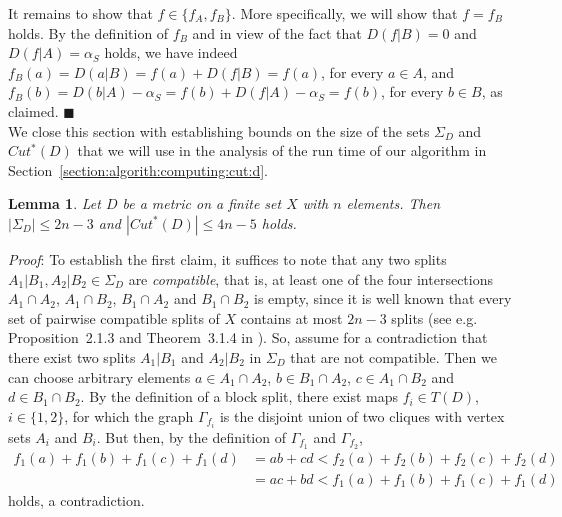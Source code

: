 \documentclass[12pt]{article}
\newtheorem{lemma}[prop]{Lemma}
\begin{document}
It remains to show that \(f \in \{f_A,f_B\}\). More specifically, we will show
that \(f=f_B\) holds. By the definition
of \(f_B\) and in view of the fact that \(D(f|B)=0\) and
\(D(f|A) = \alpha_S\) holds, we have indeed
\(f_B(a) = D(a|B) = f(a) + D(f|B) = f(a)\),
for every $a\in A$, and
\(f_B(b) = D(b|A) - \alpha_S = f(b) + D(f|A) - \alpha_S = f(b)\),
for every $b\in B$, as claimed.
\hfill\(\blacksquare\)\\

We close this section with establishing bounds on the size of the sets 
\(\Sigma_D\) and \(Cut^*(D)\) that we will use in the analysis
of the run time of our algorithm in Section~\ref{section:algorith:computing:cut:d}. 

\begin{lemma}
\label{lemma:number:cut:points}
Let \(D\) be a metric on a finite set \(X\) with \(n\) elements.
Then  \(|\Sigma_D| \le 2n-3\) and \(|Cut^*(D)| \le 4n - 5\) holds.
\end{lemma}


\noindent\textsl{Proof}:
To establish the first claim, it suffices to
note that any two splits \(A_1|B_1, A_2|B_2 \in \Sigma_D\) 
are \emph{compatible}, that is, at least one 
of the four intersections \(A_1 \cap A_2\), \(A_1 \cap B_2\), 
\(B_1 \cap A_2\) and \(B_1 \cap B_2\) is empty, since it
is well known that every set of pairwise compatible splits of
\(X\) contains at most \(2n-3\) splits (see e.g. Proposition~2.1.3 and 
Theorem~3.1.4 in \cite{sem-ste-03a}). 
So, assume for a contradiction that there exist two splits \(A_1|B_1\)
and \(A_2|B_2\) in \(\Sigma_D\) that are not compatible. Then we can
choose arbitrary elements \(a \in A_1 \cap A_2\), \(b \in B_1 \cap A_2\),
\(c \in A_1 \cap B_2\) and \(d \in B_1 \cap B_2\). By the definition
of a block split, there exist maps \(f_i \in T(D)\), \(i \in \{1,2\}\), 
for which the graph \(\Gamma_{f_i}\) is the 
disjoint union of two cliques with vertex sets \(A_i\) and \(B_i\).
But then, by the definition of \(\Gamma_{f_1}\) and \(\Gamma_{f_2}\),
\begin{align*}
f_1(a)+f_1(b)+f_1(c)+f_1(d) &= ab + cd < f_2(a)+f_2(b)+f_2(c)+f_2(d)\\
&= ac+bd < f_1(a)+f_1(b)+f_1(c)+f_1(d)
\end{align*}
holds, a contradiction. 
\end{document}
